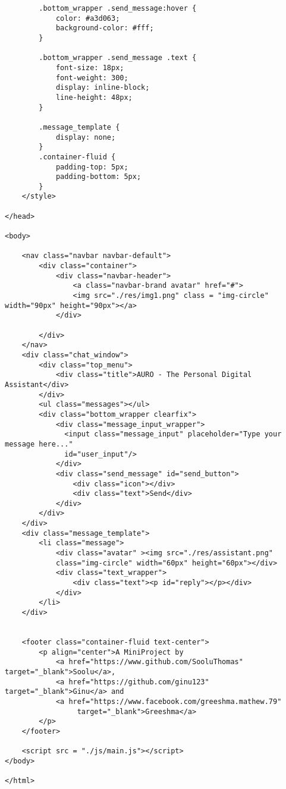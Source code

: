 \begin{verbatim}
        .bottom_wrapper .send_message:hover {
            color: #a3d063;
            background-color: #fff;
        }
        
        .bottom_wrapper .send_message .text {
            font-size: 18px;
            font-weight: 300;
            display: inline-block;
            line-height: 48px;
        }
        
        .message_template {
            display: none;
        }
        .container-fluid {
            padding-top: 5px;
            padding-bottom: 5px;
        }
    </style>

</head>

<body>

    <nav class="navbar navbar-default">
        <div class="container">
            <div class="navbar-header">
                <a class="navbar-brand avatar" href="#">
                <img src="./res/img1.png" class = "img-circle" width="90px" height="90px"></a>
            </div>
            
        </div>
    </nav>
    <div class="chat_window">
        <div class="top_menu">
            <div class="title">AURO - The Personal Digital Assistant</div>
        </div>
        <ul class="messages"></ul>
        <div class="bottom_wrapper clearfix">
            <div class="message_input_wrapper">
              <input class="message_input" placeholder="Type your message here..." 
              id="user_input"/>
            </div>
            <div class="send_message" id="send_button">
                <div class="icon"></div>
                <div class="text">Send</div>
            </div>
        </div>
    </div>
    <div class="message_template">
        <li class="message">
            <div class="avatar" ><img src="./res/assistant.png" 
            class="img-circle" width="60px" height="60px"></div>
            <div class="text_wrapper">
                <div class="text"><p id="reply"></p></div>
            </div>
        </li>
    </div>
    

    <footer class="container-fluid text-center">
        <p align="center">A MiniProject by 
			<a href="https://www.github.com/SooluThomas" target="_blank">Soolu</a>, 
			<a href="https://github.com/ginu123" target="_blank">Ginu</a> and 
			<a href="https://www.facebook.com/greeshma.mathew.79"
				 target="_blank">Greeshma</a>
		</p> 
    </footer>

    <script src = "./js/main.js"></script>
</body>

</html>
\end{verbatim}